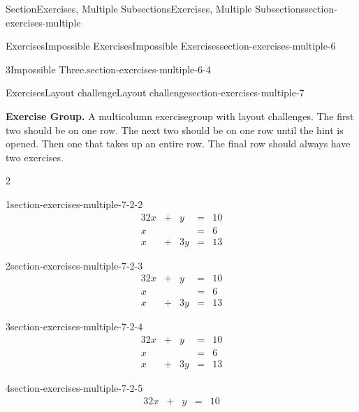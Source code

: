\documentclass[twoside,10pt,]{article}
\numberwithin{equation}{section}
\newcommand{\amp}{&}
\begin{document}
\begin{sectionptx}{Section}{Exercises, Multiple Subsections}{}{Exercises, Multiple Subsections}{}{}{section-exercises-multiple}
\begin{exercises-subsection}{Exercises}{Impossible Exercises}{}{Impossible Exercises}{}{}{section-exercises-multiple-6}
\begin{divisionexercise}{3}{Impossible Three.}{}{section-exercises-multiple-6-4}
\end{divisionexercise}%
\end{exercises-subsection}
%
%
\typeout{************************************************}
\typeout{************************************************}
%
\begin{exercises-subsection}{Exercises}{Layout challenge}{}{Layout challenge}{}{}{section-exercises-multiple-7}
\par\medskip\noindent%
\textbf{Exercise Group.}\space\space%
A multicolumn exercisegroup with layout challenges. The first two should be on one row. The next two should be on one row until the hint is opened. Then one that takes up an entire row. The final row should always have two exercises.%
\begin{exercisegroupcol}{2}
\begin{divisionexerciseegcol}{1}{}{}{section-exercises-multiple-7-2-2}%
%
\begin{alignat*}{3}
2x \amp {}+{} \amp  y \amp {}={} \amp 10\\
x  \amp       \amp    \amp {}={} \amp 6\\
x  \amp {}+{} \amp 3y \amp {}={} \amp 13
\end{alignat*}
\end{divisionexerciseegcol}%
\begin{divisionexerciseegcol}{2}{}{}{section-exercises-multiple-7-2-3}%
%
\begin{alignat*}{3}
2x \amp {}+{} \amp  y \amp {}={} \amp 10\\
x  \amp       \amp    \amp {}={} \amp 6\\
x  \amp {}+{} \amp 3y \amp {}={} \amp 13
\end{alignat*}
\end{divisionexerciseegcol}%
\begin{divisionexerciseegcol}{3}{}{}{section-exercises-multiple-7-2-4}%
%
\begin{alignat*}{3}
2x \amp {}+{} \amp  y \amp {}={} \amp 10\\
x  \amp       \amp    \amp {}={} \amp 6\\
x  \amp {}+{} \amp 3y \amp {}={} \amp 13
\end{alignat*}
\end{divisionexerciseegcol}%
\begin{divisionexerciseegcol}{4}{}{}{section-exercises-multiple-7-2-5}%
%
\begin{alignat*}{3}
2x \amp {}+{} \amp  y \amp {}={} \amp 10\\

\end{alignat*}
\end{divisionexerciseegcol}
\end{exercisegroupcol}
\end{exercises-subsection}
\end{sectionptx}
\end{document}
